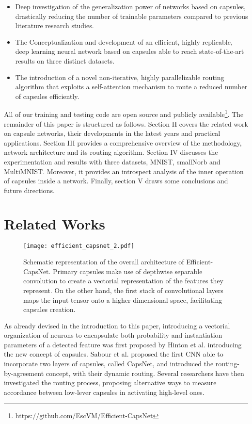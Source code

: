 \documentclass{article}
\begin{document}
\begin{itemize}
    \item Deep investigation of the generalization power of networks based on capsules, drastically reducing the number of trainable parameters compared to previous literature research studies.
    \item The Conceptualization and development of an efficient, highly replicable, deep learning neural network based on capsules able to reach state-of-the-art results on three distinct datasets.
    \item The introduction of a novel non-iterative, highly parallelizable routing algorithm that exploits a self-attention mechanism to route a reduced number of capsules efficiently.
\end{itemize}
All of our training and testing code are open source and publicly available\footnote[1]{https://github.com/EscVM/Efficient-CapsNet}.
The remainder of this paper is structured as follows. Section
II covers the related work on capsule networks, their developments in the latest years and practical applications. Section III provides a comprehensive overview of the methodology, network architecture and its routing algorithm. Section IV discusses the experimentation and results with three datasets, MNIST, smallNorb and MultiMNIST. Moreover, it provides an introspect analysis of the inner operation of capsules inside a network. Finally, section V draws some conclusions and future directions.


\section{Related Works}
\begin{figure}[t]
    \centering
    \texttt{[image: efficient\_capsnet\_2.pdf]}
    \caption{Schematic representation of the overall architecture of Efficient-CapsNet. Primary capsules make use of depthwise separable convolution to create a vectorial representation of the features they represent. On the other hand, the first stack of convolutional layers maps the input tensor onto a higher-dimensional space, facilitating capsules creation.}
    \label{fig:network}
\end{figure}
As already devised in the introduction to this paper, introducing a vectorial organization of neurons to encapsulate both probability and instantiation parameters of a detected feature was first proposed by Hinton et al. \cite{hinton2011transforming} introducing the new concept of capsules. Sabour et al. \cite{sabour2017dynamic} proposed the first CNN able to incorporate two layers of capsules, called CapsNet, and introduced the routing-by-agreement concept, with their dynamic routing. Several researchers have then investigated the routing process, proposing alternative ways to measure accordance between low-lever capsules in activating high-level ones.
\end{document}
